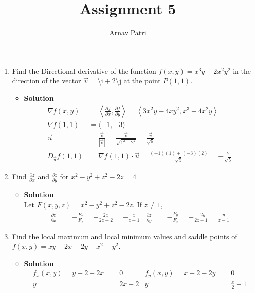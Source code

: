 \documentclass[11pt]{article}
\title{Assignment 5}
\author{Arnav Patri}
\newcommand{\pder}[2]{\frac{\partial #1}{\partial #2}}
\newcommand{\vi}{\text{\^\i}}
\newcommand{\vj}{\text{\^\j}}
\begin{document}
	\maketitle
	\thispagestyle{empty}
	\begin{enumerate}
		\item
			Find the Directional derivative of the function $f(x, y) = x^3y - 2x^2y^2$ in the direction of the vector $\vec{v} = \vi + 2\vj$ at the point $P(1, 1)$.
			\begin{itemize}[ ]
				\item \textbf{Solution}
					\begin{align*}
						\nabla f(x, y) &= \left\langle \pder{f}{x}, \pder{f}{y} \right\rangle
								= \left\langle 3x^2y - 4xy^2, x^3 - 4x^2y \right\rangle \\
						\nabla f(1, 1) &= \langle -1, -3 \rangle \\
						\vec{u} &= \frac{\vec{v}}{|\vec{v}|}
								= \frac{\vec{v}}{\sqrt{1^2 + 2^2}} 
								= \frac{\vec{v}}{\sqrt{5}} \\
						D_{\vec{u}}f(1, 1) &= \nabla f(1, 1) \cdot \vec{u}
								= \frac{(-1)(1) + (-3)(2)}{\sqrt{5}}
								= -\frac{7}{\sqrt{5}}
					\end{align*}
			\end{itemize}
		\item
			Find $\pder{z}{x}$ and $\pder{z}{y}$ for $x^2 - y^2 + z^2 - 2z = 4$
			\begin{itemize}[ ]
				\item \textbf{Solution} \\
					Let $F(x, y, z) = x^2 - y^2 + z^2 - 2z$. If $z \ne 1$,
					\begin{align*}
						\pder{z}{x} &= -\frac{F_x}{F_z}
								= -\frac{2x}{2z - 2}
								= -\frac{x}{z - 1} &
						\pder{z}{y} &= -\frac{F_y}{F_z}
								= -\frac{-2y}{2z - 1}
								= \frac{y}{z - 1} 
					\end{align*}
			\end{itemize}
		\item
			Find the local maximum and local minimum values and saddle points of $f(x, y) = xy - 2x - 2y - x^2 - y^2$.
			\begin{itemize}[ ]
				\item \textbf{Solution}
					\begin{align*}
						f_x(x, y) = y - 2 - 2x &= 0 &
								f_y(x, y) = x - 2 - 2y &= 0 \\
							y &= 2x + 2 &
								y &= \frac{x}{2} - 1 \\

\end{align*}
\end{itemize}
\end{enumerate}
\end{document}
